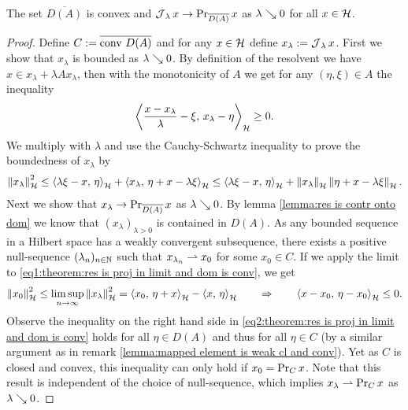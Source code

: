 \begin{theorem}\label{theorem:res is proj in limit and dom is conv}
	The set $ \overline{D(A)} $ is convex and 
	$ \operatorname{\mathcal{J}}_\lambda x \rightarrow \operatorname{\mathrm{Pr}}_{\overline{D(A)}} x $ 
	as $ \lambda\searrow 0 $ for all $ x\in\mathcal{H} $.
\end{theorem}
\begin{proof}
	Define $ C:=\overline{\operatorname{\mathrm{conv}\,} D(A)}  $ and for any $ x\in\mathcal{H} $
	define $ x_\lambda:=\operatorname{\mathcal{J}}_\lambda x $. First we show
	that $ x_\lambda $ is bounded as $ \lambda \searrow 0 $. 
	By definition of the resolvent 
	we have $ x\in x_\lambda+\lambda A x_\lambda $,
	then with the monotonicity of $ A $ we get
	for any $ (\eta,\xi)\in A $ the inequality
	\begin{align*}
		\left\langle \frac{x-x_\lambda}{\lambda}-\xi,\,x_\lambda-\eta\right\rangle_{\mathcal{H}}\geq 0.
	\end{align*}
	We multiply with $ \lambda $ and use the Cauchy-Schwartz inequality 
	to prove the boundedness of $ x_\lambda $ by
	\begin{align}\label{eq1:theorem:res is proj in limit and dom is conv}
		\left\Vert x_\lambda\right\Vert_{\mathcal{H}}^2
		\leq \left\langle \lambda \xi - x,\,\eta\right\rangle_{\mathcal{H}}+\left\langle x_\lambda,\,\eta+x-\lambda \xi\right\rangle_{\mathcal{H}}
		\leq \left\langle \lambda \xi - x,\,\eta\right\rangle_{\mathcal{H}}+\left\Vert x_\lambda\right\Vert_{\mathcal{H}}\left\Vert \eta+x-\lambda \xi\right\Vert_{\mathcal{H}}.
	\end{align}
	Next we show that $ x_\lambda \rightarrow \operatorname{\mathrm{Pr}}_{\overline{D(A)}} x $ 
	as $ \lambda\searrow 0 $. 
	By lemma \ref{lemma:res is contr onto dom} we know that
	$ (x_\lambda)_{\lambda>0} $ is contained in $ D(A) $.
	As any bounded sequence in a Hilbert space has a weakly convergent
	subsequence,
	there exists a positive null-sequence $ (\lambda_n)_{n\in\mathbb{N}} $ such
	that $ x_{\lambda_n} \rightharpoonup x_0$ for some $ x_0 \in C $. If we apply the
	limit to \eqref{eq1:theorem:res is proj in limit and dom is conv}, 
	we get
	\begin{align}\label{eq2:theorem:res is proj in limit and dom is conv}
		\left\Vert x_0\right\Vert_{\mathcal{H}}^2
		\leq \limsup_{n \rightarrow \infty}\left\Vert x_\lambda\right\Vert_{\mathcal{H}}^2
		=\left\langle x_0,\,\eta+x\right\rangle_{\mathcal{H}}-\left\langle x,\,\eta\right\rangle_{\mathcal{H}}
		\qquad\Rightarrow\qquad
		\left\langle x-x_0,\,\eta-x_0\right\rangle_{\mathcal{H}}
		\leq 0.
	\end{align}
	Observe the inequality on the right hand side in 
	\eqref{eq2:theorem:res is proj in limit and dom is conv}
	holds for all $ \eta \in D(A) $ and thus for all $ \eta \in C $
	(by a similar argument as in remark 
	\ref{lemma:mapped element is weak cl and conv}).
	Yet as $ C $ is closed and convex, this inequality 
	can only hold if $ x_0=\operatorname{\mathrm{Pr}}_{C}x $. Note that this result is independent of 
	the choice of null-sequence, which implies $ x_\lambda \rightharpoonup \operatorname{\mathrm{Pr}}_{C}x $
	as $ \lambda \searrow 0 $.
	

\end{proof}
